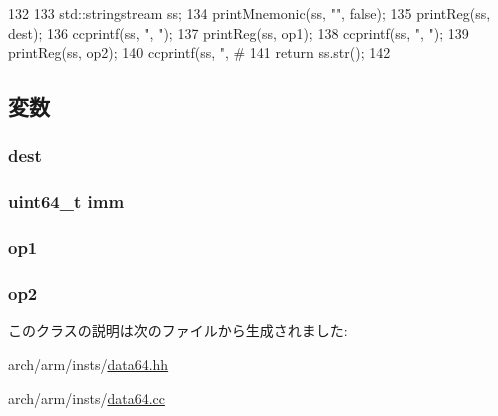 \begin{DoxyCode}
132 {
133     std::stringstream ss;
134     printMnemonic(ss, "", false);
135     printReg(ss, dest);
136     ccprintf(ss, ", ");
137     printReg(ss, op1);
138     ccprintf(ss, ", ");
139     printReg(ss, op2);
140     ccprintf(ss, ", #%
141     return ss.str();
142 }
\end{DoxyCode}


\subsection{変数}
\hypertarget{classArmISA_1_1DataX2RegImmOp_aec72e8e45bdc87abeeeb75d2a8a9a716}{
\subsubsection[{dest}]{ {\bf dest}}}
\label{classArmISA_1_1DataX2RegImmOp_aec72e8e45bdc87abeeeb75d2a8a9a716}
\hypertarget{classArmISA_1_1DataX2RegImmOp_a2b4406ad2843b5aa12d244d01d8fdc69}{
\subsubsection[{imm}]{\setlength{\rightskip}{0pt plus 5cm}uint64\_\-t {\bf imm}}}
\label{classArmISA_1_1DataX2RegImmOp_a2b4406ad2843b5aa12d244d01d8fdc69}
\hypertarget{classArmISA_1_1DataX2RegImmOp_a4c465c43ad568f8bcf8ae71480e9cfea}{
\subsubsection[{op1}]{ {\bf op1}}}
\label{classArmISA_1_1DataX2RegImmOp_a4c465c43ad568f8bcf8ae71480e9cfea}
\hypertarget{classArmISA_1_1DataX2RegImmOp_a7799ff6cbe5a252199059eb8665820e7}{
\subsubsection[{op2}]{ {\bf op2}}}
\label{classArmISA_1_1DataX2RegImmOp_a7799ff6cbe5a252199059eb8665820e7}


このクラスの説明は次のファイルから生成されました:\begin{DoxyCompactItemize}
\item 
arch/arm/insts/\hyperlink{data64_8hh}{data64.hh}\item 
arch/arm/insts/\hyperlink{data64_8cc}{data64.cc}\end{DoxyCompactItemize}
